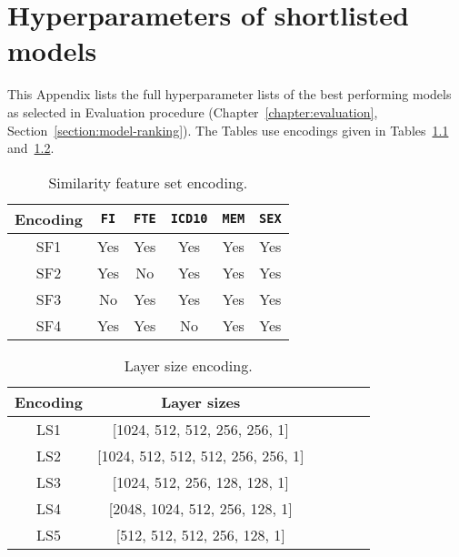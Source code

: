 \chapter{Hyperparameters of shortlisted models}
\label{appendix:hyperparameters}

This Appendix lists the full hyperparameter lists of the best performing models as selected in Evaluation procedure (Chapter~\ref{chapter:evaluation}, Section~\ref{section:model-ranking}). The Tables use encodings given in Tables~\ref{table:sf-encoding} and~\ref{table:ls-encoding}.

\begin{table}[h]
    \caption{Similarity feature set encoding.}\label{table:sf-encoding}
    \centering
    \small
    \begin{tabular}{cccccc}
        \hline
    \textbf{Encoding} & \texttt{FI} &  \texttt{FTE}& \texttt{ICD10}& \texttt{MEM}& \texttt{SEX}\\  \hline
        SF1 & Yes & Yes & Yes & Yes & Yes \\
        SF2 & Yes & No & Yes & Yes & Yes \\
        SF3 & No & Yes & Yes & Yes & Yes \\
        SF4 & Yes & Yes & No & Yes & Yes \\ \hline
\end{tabular}
\end{table}

\begin{table}[h]
    \caption{Layer size encoding.}\label{table:ls-encoding}
    \centering
    \small
    \begin{tabular}{cccccc}
        \hline
    \textbf{Encoding} & \textbf{Layer sizes} \\  \hline
        LS1 & [1024, 512, 512, 256, 256, 1] \\ 
        LS2 & [1024, 512, 512, 512, 256, 256, 1] \\
        LS3 & [1024, 512, 256, 128, 128, 1] \\
        LS4 & [2048, 1024, 512, 256, 128, 1] \\
        LS5 & [512, 512, 512, 256, 128, 1] \\ \hline
\end{tabular}
\end{table}

